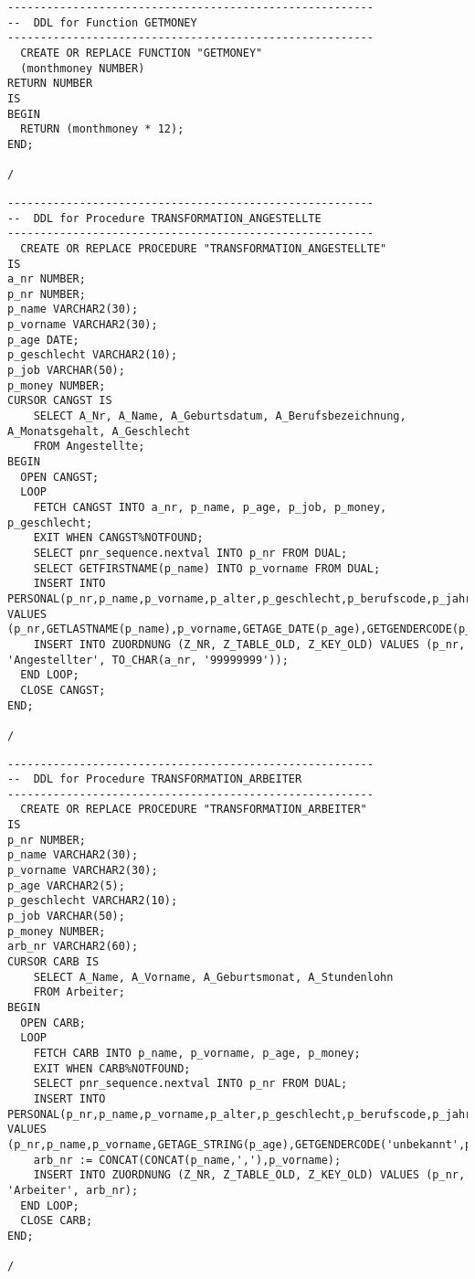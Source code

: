 \documentclass{scrartcl}
\begin{document}
\begin{lstlisting}
--------------------------------------------------------
--  DDL for Function GETMONEY
--------------------------------------------------------
  CREATE OR REPLACE FUNCTION "GETMONEY" 
  (monthmoney NUMBER)
RETURN NUMBER
IS
BEGIN
  RETURN (monthmoney * 12);
END;

/
\end{lstlisting}

\begin{lstlisting}
--------------------------------------------------------
--  DDL for Procedure TRANSFORMATION_ANGESTELLTE
--------------------------------------------------------
  CREATE OR REPLACE PROCEDURE "TRANSFORMATION_ANGESTELLTE" 
IS
a_nr NUMBER;
p_nr NUMBER;
p_name VARCHAR2(30);
p_vorname VARCHAR2(30);
p_age DATE;
p_geschlecht VARCHAR2(10);
p_job VARCHAR(50);
p_money NUMBER;
CURSOR CANGST IS
	SELECT A_Nr, A_Name, A_Geburtsdatum, A_Berufsbezeichnung, A_Monatsgehalt, A_Geschlecht
	FROM Angestellte;
BEGIN
  OPEN CANGST;
  LOOP 
	FETCH CANGST INTO a_nr, p_name, p_age, p_job, p_money, p_geschlecht;
	EXIT WHEN CANGST%NOTFOUND;
	SELECT pnr_sequence.nextval INTO p_nr FROM DUAL;
  	SELECT GETFIRSTNAME(p_name) INTO p_vorname FROM DUAL;
  	INSERT INTO PERSONAL(p_nr,p_name,p_vorname,p_alter,p_geschlecht,p_berufscode,p_jahreseinkommen) VALUES (p_nr,GETLASTNAME(p_name),p_vorname,GETAGE_DATE(p_age),GETGENDERCODE(p_geschlecht,p_vorname),GETJOBCODE(p_job),GETMONEY(p_money));
	INSERT INTO ZUORDNUNG (Z_NR, Z_TABLE_OLD, Z_KEY_OLD) VALUES (p_nr, 'Angestellter', TO_CHAR(a_nr, '99999999'));
  END LOOP; 
  CLOSE CANGST;
END;

/
\end{lstlisting}

\begin{lstlisting}
--------------------------------------------------------
--  DDL for Procedure TRANSFORMATION_ARBEITER
--------------------------------------------------------
  CREATE OR REPLACE PROCEDURE "TRANSFORMATION_ARBEITER" 
IS
p_nr NUMBER;
p_name VARCHAR2(30);
p_vorname VARCHAR2(30);
p_age VARCHAR2(5);
p_geschlecht VARCHAR2(10);
p_job VARCHAR(50);
p_money NUMBER;
arb_nr VARCHAR2(60);
CURSOR CARB IS
	SELECT A_Name, A_Vorname, A_Geburtsmonat, A_Stundenlohn
	FROM Arbeiter;
BEGIN
  OPEN CARB;
  LOOP 
	FETCH CARB INTO p_name, p_vorname, p_age, p_money;
	EXIT WHEN CARB%NOTFOUND;
	SELECT pnr_sequence.nextval INTO p_nr FROM DUAL;
 	INSERT INTO PERSONAL(p_nr,p_name,p_vorname,p_alter,p_geschlecht,p_berufscode,p_jahreseinkommen) VALUES (p_nr,p_name,p_vorname,GETAGE_STRING(p_age),GETGENDERCODE('unbekannt',p_vorname),GETJOBCODE('Arbeiter'),GETMONEY(p_money*4*40));
	arb_nr := CONCAT(CONCAT(p_name,','),p_vorname);
	INSERT INTO ZUORDNUNG (Z_NR, Z_TABLE_OLD, Z_KEY_OLD) VALUES (p_nr, 'Arbeiter', arb_nr);
  END LOOP; 
  CLOSE CARB;
END;

/
\end{lstlisting}
\end{document}
